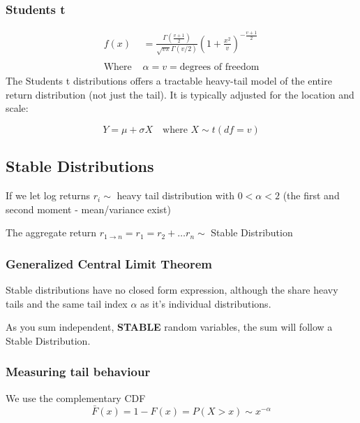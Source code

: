 \documentclass[
  oneside]{book}
\begin{document}
\hypertarget{students-t}{%
\subsubsection{Students t}\label{students-t}}

\[
\begin{aligned}
f(x) &= \frac{\Gamma\left( \frac{v+1}{2} \right)}{\sqrt{ v\pi }\Gamma(v/2)}\left( 1+\frac{x^{2}}{v} \right)^{-\frac{v+1}{2}}\\
\\
\text{Where } &\alpha = v = \text{degrees of freedom}
\end{aligned}
\]
The Students t distributions offers a tractable heavy-tail model of the entire return distribution (not just the tail). It is typically adjusted for the location and scale:

\[
Y = \mu + \sigma X \quad \text{where } X \sim t(df=v)
\]

\hypertarget{stable-distributions}{%
\subsection{Stable Distributions}\label{stable-distributions}}

If we let log returns \(r_{i} \sim\) heavy tail distribution with \(0<\alpha<2\) (the first and second moment - mean/variance exist)

The aggregate return \(r_{1\to n} = r_{1} = r_{2} + \dots r_{n} \sim\) Stable Distribution

\hypertarget{generalized-central-limit-theorem}{%
\subsubsection{Generalized Central Limit Theorem}\label{generalized-central-limit-theorem}}

Stable distributions have no closed form expression, although the share heavy tails and the same tail index \(\alpha\) as it's individual distributions.

As you sum independent, \textbf{STABLE} random variables, the sum will follow a Stable Distribution.

\hypertarget{measuring-tail-behaviour}{%
\subsubsection{Measuring tail behaviour}\label{measuring-tail-behaviour}}

We use the complementary CDF
\[
\bar{F}(x) = 1 - F(x) = P(X > x) \sim x^{-\alpha}
\]
\end{document}
